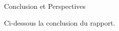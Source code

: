 \begin{center}{\Huge Conclusion et Perspectives}
\end{center}
{\large
Ci-dessous la conclusion du rapport.
} 